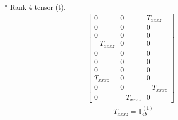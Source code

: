 \documentclass[fleqn,8pt,landscape]{jsarticle}
\begin{document}
* Rank 4 tensor (t).
\begin{align*}
\begin{bmatrix} 0 & 0 & T_{xxxz} \\ 0 & 0 & 0 \\ 0 & 0 & 0 \\ - T_{xxxz} & 0 & 0 \\ 0 & 0 & 0 \\ 0 & 0 & 0 \\ 0 & 0 & 0 \\ T_{xxxz} & 0 & 0 \\ 0 & 0 & - T_{xxxz} \\ 0 & - T_{xxxz} & 0 \end{bmatrix}
\end{align*}
\begin{align*}
& T_{xxxz} = \mathbb{T}_{4b}^{(1)}
\end{align*}
\end{document}
